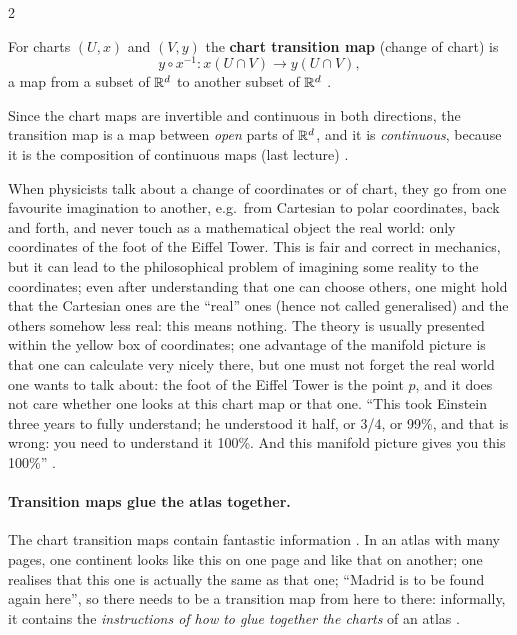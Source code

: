 \begin{paracol}{2}
\begin{definition}\label{def:c02-transition}
For charts $(U,x)$ and $(V,y)$ the \textbf{chart transition map} (change of chart) is
\[
  y\circ x^{-1}\colon x(U\cap V)\longrightarrow y(U\cap V),
\]
a map from a subset of $\mathbb{R}^d$ to another subset of $\mathbb{R}^d$ .
\end{definition}
Since the chart maps are invertible and continuous in both directions, the transition map is a map between \emph{open} parts of $\mathbb{R}^d$, and it is \emph{continuous}, because it is the composition of continuous maps (last lecture)
.

When physicists talk about a change of coordinates or of chart, they go from one favourite imagination to another, e.g.\ from Cartesian to polar coordinates, back and forth, and never touch as a mathematical object the real world: only
coordinates of the foot of the Eiffel Tower. This is fair and correct in mechanics, but it can lead to the philosophical problem of imagining some reality to the coordinates; even after understanding that one can choose others, one might hold that the Cartesian ones are the ``real'' ones
(hence not called generalised) and the others somehow less real: this means nothing. The theory is usually presented within the yellow box of coordinates; one advantage of the manifold picture is that one can calculate very nicely there, but one must not forget the real world one wants to talk about:
the foot of the Eiffel Tower is the point $p$, and it does not care whether one looks at this chart map or that one. ``This took Einstein three years to fully understand; he understood it half, or 3/4, or 99\%, and that is wrong: you need to understand it 100\%. And this manifold picture gives you
this 100\%'' .

\paragraph{Transition maps glue the atlas together.} The chart transition maps contain fantastic information . In an atlas with many pages, one continent looks like this on one page and like that on another; one realises that this one is actually the same as that one;
``Madrid is to be found again here'', so there needs to be a transition map from here to there: informally, it contains the \emph{instructions of how to glue together the charts} of an atlas .


\end{paracol}
